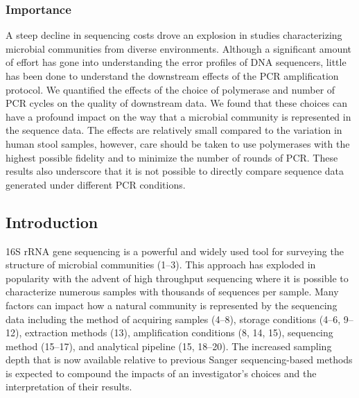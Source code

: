 \documentclass[11pt,]{article}
\begin{document}
\hypertarget{importance}{%
\subsubsection{Importance}\label{importance}}

A steep decline in sequencing costs drove an explosion in studies
characterizing microbial communities from diverse environments. Although
a significant amount of effort has gone into understanding the error
profiles of DNA sequencers, little has been done to understand the
downstream effects of the PCR amplification protocol. We quantified the
effects of the choice of polymerase and number of PCR cycles on the
quality of downstream data. We found that these choices can have a
profound impact on the way that a microbial community is represented in
the sequence data. The effects are relatively small compared to the
variation in human stool samples, however, care should be taken to use
polymerases with the highest possible fidelity and to minimize the
number of rounds of PCR. These results also underscore that it is not
possible to directly compare sequence data generated under different PCR
conditions.

\newpage

\hypertarget{introduction}{%
\subsection{Introduction}\label{introduction}}

16S rRNA gene sequencing is a powerful and widely used tool for
surveying the structure of microbial communities (1--3). This approach
has exploded in popularity with the advent of high throughput sequencing
where it is possible to characterize numerous samples with thousands of
sequences per sample. Many factors can impact how a natural community is
represented by the sequencing data including the method of acquiring
samples (4--8), storage conditions (4--6, 9--12), extraction methods
(13), amplification conditions (8, 14, 15), sequencing method (15--17),
and analytical pipeline (15, 18--20). The increased sampling depth that
is now available relative to previous Sanger sequencing-based methods is
expected to compound the impacts of an investigator's choices and the
interpretation of their results.
\end{document}
